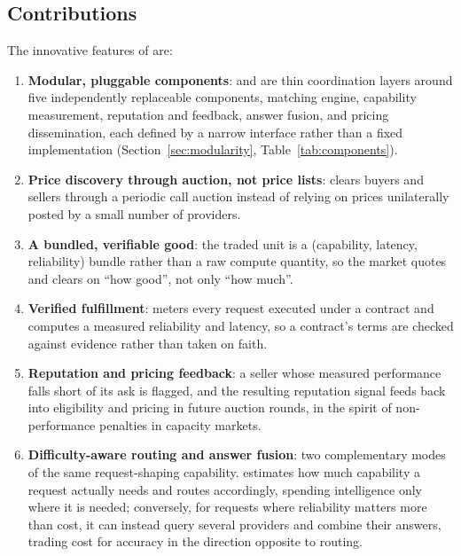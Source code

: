 \subsection{Contributions}
\label{sec:contributions}

The innovative features of \Noesis{} are:

\begin{enumerate}
  \item \textbf{Modular, pluggable components}: \NoesisMarket{} and
    \NoesisServer{} are thin coordination layers around five independently
    replaceable components, matching engine, capability measurement,
    reputation and feedback, answer fusion, and pricing dissemination,
    each defined by a narrow interface rather than a fixed implementation
    (Section~\ref{sec:modularity}, Table~\ref{tab:components}).

  \item \textbf{Price discovery through auction, not price lists}:
    \NoesisMarket{} clears buyers and sellers through a periodic call
    auction instead of relying on prices unilaterally posted by a small
    number of providers.

  \item \textbf{A bundled, verifiable good}: the traded unit is a
    (capability, latency, reliability) bundle rather than a raw compute
    quantity, so the market quotes and clears on ``how good'', not only
    ``how much''.

  \item \textbf{Verified fulfillment}: \NoesisServer{} meters every
    request executed under a contract and computes a measured reliability
    and latency, so a contract's terms are checked against evidence rather
    than taken on faith.

  \item \textbf{Reputation and pricing feedback}: a seller whose measured
    performance falls short of its ask is flagged, and the resulting
    reputation signal feeds back into eligibility and pricing in future
    auction rounds, in the spirit of non-performance penalties in capacity
    markets.

  \item \textbf{Difficulty-aware routing and answer fusion}: two
    complementary modes of the same request-shaping capability.
    \NoesisServer{} estimates how much capability a request actually
    needs and routes accordingly, spending intelligence only where it is
    needed; conversely, for requests where reliability matters more than
    cost, it can instead query several providers and combine their
    answers, trading cost for accuracy in the direction opposite to
    routing.


\end{enumerate}
